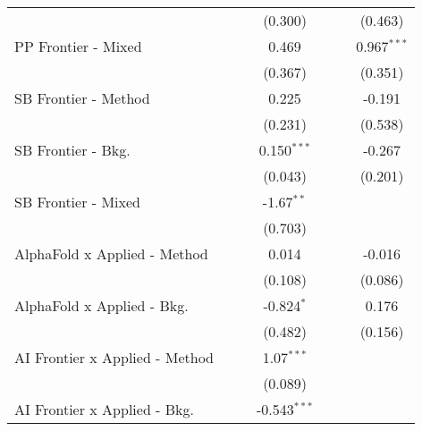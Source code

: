 \begin{tabular}{lcccccc}
                                  &                &               & (0.300)        &               &         & (0.463)\\   
   PP Frontier - Mixed            &                &               & 0.469          &               &         & 0.967$^{***}$\\   
                                  &                &               & (0.367)        &               &         & (0.351)\\   
   SB Frontier - Method           &                &               & 0.225          &               &         & -0.191\\   
                                  &                &               & (0.231)        &               &         & (0.538)\\   
   SB Frontier - Bkg.             &                &               & 0.150$^{***}$  &               &         & -0.267\\   
                                  &                &               & (0.043)        &               &         & (0.201)\\   
   SB Frontier - Mixed            &                &               & -1.67$^{**}$   &               &         &   \\   
                                  &                &               & (0.703)        &               &         &   \\   
   AlphaFold x Applied - Method   &                &               & 0.014          &               &         & -0.016\\   
                                  &                &               & (0.108)        &               &         & (0.086)\\   
   AlphaFold x Applied - Bkg.     &                &               & -0.824$^{*}$   &               &         & 0.176\\   
                                  &                &               & (0.482)        &               &         & (0.156)\\   
   AI Frontier x Applied - Method &                &               & 1.07$^{***}$   &               &         &   \\   
                                  &                &               & (0.089)        &               &         &   \\   
   AI Frontier x Applied - Bkg.   &                &               & -0.543$^{***}$ &               &         &   \\   

\end{tabular}
